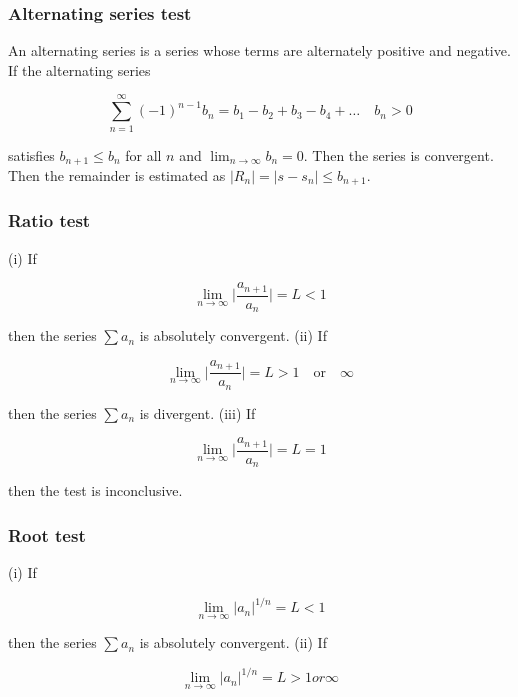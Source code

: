 \documentclass[a4paper]{article}
\begin{document}
\subsubsection*{Alternating series test}
An alternating series is a series whose terms are alternately positive and negative. If the alternating series 

\begin{equation}
    \sum_{n=1}^{\infty} (-1)^{n-1}b_n=b_1-b_2+b_3-b_4+\dots\quad b_n>0
\end{equation}

satisfies $b_{n+1}\le b_n$ for all $n$ and $\lim_{n\rightarrow\infty}b_n=0$. Then the series is convergent. Then the remainder is estimated as $|R_n|=|s-s_n|\le b_{n+1}$.

\subsubsection*{Ratio test}
(i) If 

\begin{equation}
    \lim_{n\rightarrow\infty}\bigg|\frac{a_{n+1}}{a_n}\bigg|= L < 1
\end{equation}

then the series $\sum a_n$ is absolutely convergent. (ii) If 

\begin{equation}
    \lim_{n\rightarrow\infty}\bigg|\frac{a_{n+1}}{a_n}\bigg|= L > 1\quad\text{or}\quad \infty
\end{equation}

then the series $\sum a_n$ is divergent. (iii) If 

\begin{equation}
    \lim_{n\rightarrow\infty}\bigg|\frac{a_{n+1}}{a_n}\bigg|= L = 1
\end{equation}

then the test is inconclusive.

\subsubsection*{Root test}
(i) If 

\begin{equation}
    \lim_{n\rightarrow\infty}|a_n|^{1/n}= L < 1
\end{equation}

then the series $\sum a_n$ is absolutely convergent. (ii) If 

\begin{equation}
    \lim_{n\rightarrow\infty}|a_n|^{1/n}= L > 1 or \infty
\end{equation}
\end{document}
